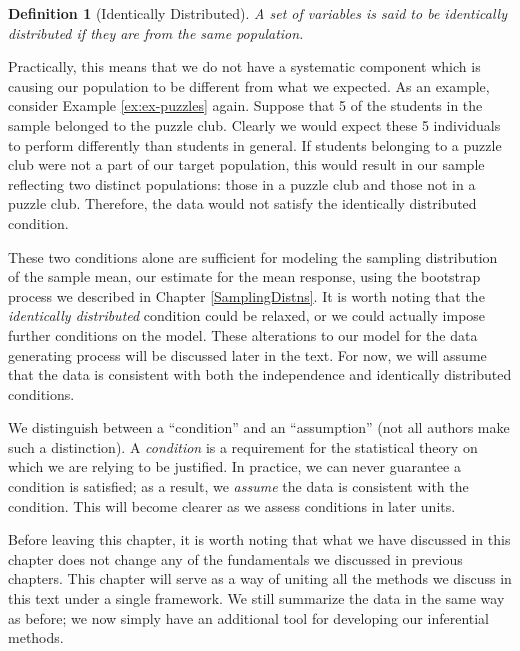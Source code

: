 \documentclass[
]{book}
\theoremstyle{plain}
\theoremstyle{mydefn}
\newtheorem{definition}{Definition}[chapter]
\theoremstyle{myexmpl}
\theoremstyle{remark}
\begin{document}
\begin{definition}[Identically Distributed]
\protect\hypertarget{def:defn-identically-distributed}{}{\label{def:defn-identically-distributed} {} }A set of variables is said to be identically distributed if they are from the same population.
\end{definition}

Practically, this means that we do not have a systematic component which is causing our population to be different from what we expected. As an example, consider Example \ref{ex:ex-puzzles} again. Suppose that 5 of the students in the sample belonged to the puzzle club. Clearly we would expect these 5 individuals to perform differently than students in general. If students belonging to a puzzle club were not a part of our target population, this would result in our sample reflecting two distinct populations: those in a puzzle club and those not in a puzzle club. Therefore, the data would not satisfy the identically distributed condition.

These two conditions alone are sufficient for modeling the sampling distribution of the sample mean, our estimate for the mean response, using the bootstrap process we described in Chapter \ref{SamplingDistns}. It is worth noting that the \emph{identically distributed} condition could be relaxed, or we could actually impose further conditions on the model. These alterations to our model for the data generating process will be discussed later in the text. For now, we will assume that the data is consistent with both the independence and identically distributed conditions.

\begin{rmdtip}
We distinguish between a ``condition'' and an ``assumption'' (not all authors make such a distinction). A \emph{condition} is a requirement for the statistical theory on which we are relying to be justified. In practice, we can never guarantee a condition is satisfied; as a result, we \emph{assume} the data is consistent with the condition. This will become clearer as we assess conditions in later units.
\end{rmdtip}

Before leaving this chapter, it is worth noting that what we have discussed in this chapter does not change any of the fundamentals we discussed in previous chapters. This chapter will serve as a way of uniting all the methods we discuss in this text under a single framework. We still summarize the data in the same way as before; we now simply have an additional tool for developing our inferential methods.
\end{document}

